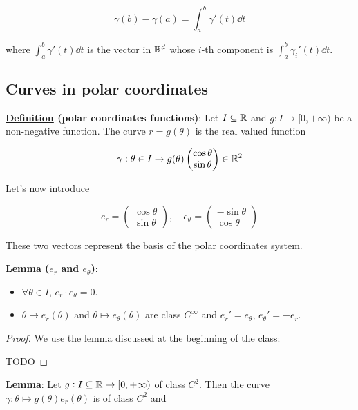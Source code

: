 \documentclass[10pt]{extarticle}
\begin{document}
$$
    \gamma(b) - \gamma(a) = \int_a^b \gamma'(t) \dd{t}
$$

where $\int_a^b \gamma'(t) \dd{t}$ is the vector in $\mathbb{R}^d$ whose $i$-th component is $\int_a^b \gamma_i'(t) \dd{t}$.

\subsection{Curves in polar coordinates}

\textbf{\underline{Definition} (polar coordinates functions)}:
Let $I \subseteq \mathbb{R}$ and $g: I \to [0, +\infty)$ be a non-negative function.
The curve $r = g(\theta)$ is the real valued function

$$
    \gamma: \theta \in I \to g(\theta) \begin{pmatrix}
        \cos \theta \\ \sin \theta
    \end{pmatrix} \in \mathbb{R}^2
$$

Let's now introduce

$$
    e_r = \begin{pmatrix}
        \cos \theta \\ \sin \theta
    \end{pmatrix},
    \quad
    e_\theta = \begin{pmatrix}
        -\sin \theta \\ \cos \theta
    \end{pmatrix}
$$

These two vectors represent the basis of the polar coordinates system.

\textbf{\underline{Lemma} ($e_r$ and $e_\theta$)}:
\begin{itemize}
    \item $\forall \theta \in I$, $e_r \cdot e_\theta = 0$.
    \item $\theta \mapsto e_r(\theta)$ and $\theta \mapsto e_\theta(\theta)$ are class $C^\infty$ and $e_r' = e_\theta$, $e_\theta' = -e_r$.
\end{itemize}

\begin{proof}
    We use the lemma discussed at the beginning of the class:

    TODO
\end{proof}

\textbf{\underline{Lemma}}: Let $g: I \subseteq \mathbb{R} \to [0, +\infty)$ of class $C^2$.
Then the curve $\gamma: \theta \mapsto g(\theta) e_r(\theta)$ is of class $C^2$ and
\end{document}
